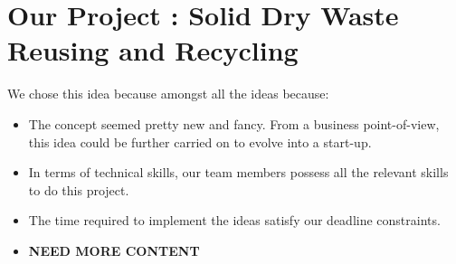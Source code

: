 \documentclass{article}
\begin{document}
\section{Our Project : Solid Dry Waste Reusing and Recycling}
\par We chose this idea because amongst all the ideas because:
\begin{itemize}
    \item The concept seemed pretty new and fancy. From a business point-of-view, this idea could be further carried on to evolve into a start-up. 
    \item In terms of technical skills, our team members possess all the relevant skills to do this project.
    \item The time required to implement the ideas satisfy our deadline constraints.
    \item \textbf{NEED MORE CONTENT}
\end{itemize} 
\end{document}
